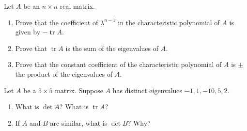 \documentclass[12pt]{article}
\theoremstyle{remark}
\newtheorem*{solution}{Solution}
\renewcommand{\=}{&=&}
\newcommand{\<}{\langle}
\renewcommand{\>}{\rangle}
\DeclareMathOperator{\trace}{tr}
\begin{document}
\begin{problems}
\begin{enumerate}
\end{enumerate}




\item 
Let $A$ be an $n \times n$ real matrix.
\begin{enumerate}
	\item Prove that the coefficient of $\lambda^{n-1}$ in the characteristic polynomial
	of $A$ is given by $-\trace A$.
	
	
	\item Prove that $\trace A$ is the sum of the eigenvalues of $A$.
	
	
	\item Prove that the constant coefficient of the characteristic polynomial of $A$ is
	$\pm$ the product of the eigenvalues of $A$.
	
\end{enumerate}



\item 
Let $A$ be a $5 \times 5$ matrix. Suppose $A$ has distinct eigenvalues
$-1,1,-10,5,2$.
\begin{enumerate}
	\item What is $\det A$? What is $\trace A$?
	
	
	\item If $A$ and $B$ are similar, what is $\det B$? Why?
	

\end{enumerate}
\end{problems}
\end{document}
